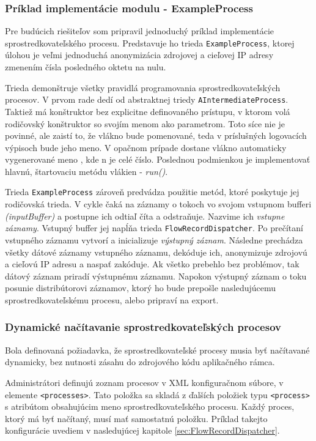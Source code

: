 \subsubsection{Príklad implementácie modulu - ExampleProcess}

Pre budúcich riešiteľov som pripravil jednoduchý príklad implementácie sprostredkovateľského procesu.
Predstavuje ho trieda \verb|ExampleProcess|, ktorej úlohou je veľmi jednoduchá anonymizácia zdrojovej a 
cieľovej IP adresy zmenením čísla posledného oktetu na nulu. 

Trieda demonštruje všetky pravidlá programovania sprostredkovateľských procesov. V prvom rade dedí od 
abstraktnej triedy \verb|AIntermediateProcess|. Taktiež má konštruktor bez explicitne definovaného 
prístupu, v ktorom volá rodičovský konštruktor so svojím menom ako parametrom. Toto síce nie je povinné,
ale zaistí to, že vlákno bude pomenované, teda v príslušných logovacích výpisoch bude jeho meno.
V opačnom prípade dostane vlákno automaticky vygenerované meno , kde n je celé číslo.
Poslednou podmienkou je implementovať hlavnú, štartovaciu metódu vlákien - \emph{run()}.

Trieda \verb|ExampleProcess| zároveň predvádza použitie metód, ktoré poskytuje jej rodičovská trieda.
V cykle čaká na záznamy o tokoch vo svojom vstupnom bufferi \emph{(inputBuffer)} a postupne ich odtiaľ 
číta a odstraňuje. Nazvime ich 
\emph{vstupne záznamy}. Vstupný buffer jej napĺňa trieda \verb|FlowRecordDispatcher|. Po prečítaní 
vstupného záznamu vytvorí a inicializuje \emph{výstupný záznam}. Následne prechádza všetky dátové záznamy
vstupného záznamu, dekóduje ich, anonymizuje zdrojovú a cieľovú IP adresu a naspať zakóduje. Ak všetko 
prebehlo bez problémov, tak dátový záznam priradí výstupnému záznamu. Napokon výstupný záznam o toku 
posunie distribútorovi záznamov, ktorý ho bude prepošle 
nasledujúcemu sprostredkovateľskému procesu, alebo pripraví na export.

\subsubsection{Dynamické načítavanie sprostredkovateľských procesov}

Bola definovaná požiadavka, že sprostredkovateľské procesy musia byť načítavané dynamicky, bez nutnosti
zásahu do zdrojového kódu aplikačného rámca. 

Administrátori definujú zoznam procesov v XML konfiguračnom súbore, v elemente \verb|<processes>|. 
Tato položka sa skladá z ďalších položiek typu \verb|<process>| s atribútom 
obsahujúcim meno sprostredkovateľského procesu. Každý proces, ktorý má byť načítaný, musí mať 
samostatnú položku. Príklad takejto konfigurácie uvediem v nasledujúcej kapitole \ref{sec:FlowRecordDispatcher}.

